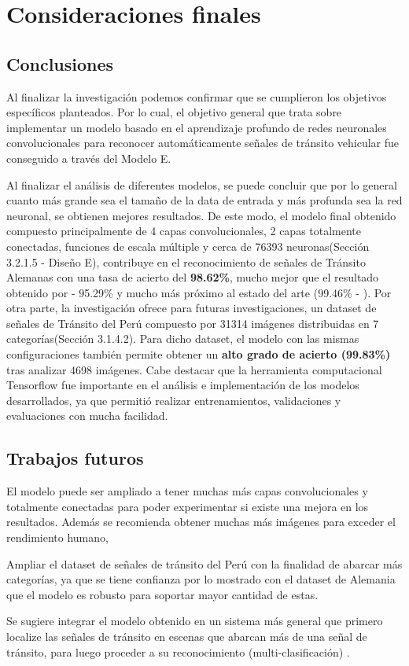\chapter{Consideraciones finales}
\setcounter{page}{138}
\renewcommand{\baselinestretch}{2} %
\textheight 21cm

\section{Conclusiones}

	Al finalizar la investigación podemos confirmar que se cumplieron los objetivos específicos planteados. Por lo cual, el objetivo general que trata sobre implementar un modelo basado en el aprendizaje profundo de redes neuronales convolucionales para reconocer automáticamente señales de tránsito vehicular fue conseguido a través del Modelo E.

	\vskip 0.2cm
	Al finalizar el análisis de diferentes modelos, se puede concluir que por lo general cuanto más grande sea el tamaño de la data de entrada y más profunda sea la red neuronal, se obtienen mejores resultados. De este modo, el modelo final obtenido compuesto principalmente de 4 capas convolucionales, 2 capas totalmente conectadas, funciones de escala múltiple y cerca de 76393 neuronas(Sección 3.2.1.5 - Diseño E), contribuye en el reconocimiento de señales de Tránsito Alemanas con una tasa de acierto del {\bf 98.62\%}, mucho mejor que el resultado obtenido por \citep{Ayuque2016} - 95.29\% y mucho más próximo al estado del arte (99.46\% - \citep{Ciresan}).
	\vskip 0.2cm
	Por otra parte, la investigación ofrece para futuras investigaciones, un dataset de señales de Tránsito del Perú compuesto por 31314 imágenes distribuidas en 7 categorías(Sección 3.1.4.2). Para dicho dataset, el modelo con las mismas configuraciones también permite obtener un {\bf alto grado de acierto (99.83\%)} tras analizar 4698 imágenes. 
	\vskip 0.2cm
	Cabe destacar que la herramienta computacional Tensorflow fue importante en el análisis e implementación de los modelos desarrollados, ya que permitió realizar entrenamientos, validaciones y evaluaciones con mucha facilidad. 


\section{Trabajos futuros}


	El modelo puede ser ampliado a tener muchas más capas convolucionales y totalmente conectadas para poder experimentar si existe una mejora en los resultados. Además se recomienda obtener muchas más imágenes para exceder el rendimiento humano, \citep{Goodfellow-et-al-2016}

	Ampliar el dataset de señales de tránsito del Perú con la finalidad de abarcar más categorías, ya que se tiene confianza por lo mostrado con el dataset de Alemania que el modelo es robusto para soportar mayor cantidad de estas.
	
	Se sugiere integrar el modelo obtenido en un sistema más general que primero localize las señales de tránsito en escenas que abarcan más de una señal de tránsito, para luego proceder a su reconocimiento (multi-clasificación) .
\newpage